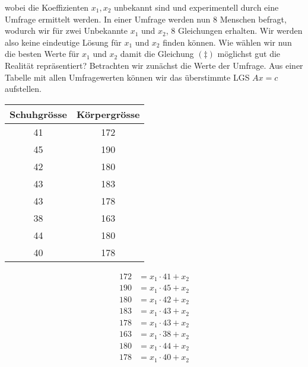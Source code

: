wobei die Koeffizienten \( x_1, x_2\) unbekannt sind und experimentell durch eine Umfrage ermittelt werden. In einer Umfrage werden nun 8 Menschen befragt, wodurch wir für zwei Unbekannte \( x_1\) und \( x_2\), 8 Gleichungen erhalten. Wir werden also keine eindeutige Lösung für \( x_1\) und \( x_2\) finden können. Wie wählen wir nun die besten Werte für \( x_1\) und \( x_2\) damit die Gleichung \( (\ddagger) \) möglichst gut die Realität repräsentiert? Betrachten wir zunächst die Werte der Umfrage. Aus einer Tabelle mit allen Umfragewerten können wir das überstimmte LGS \( Ax = c \) aufstellen. 

\vspace{1\baselineskip}

\begin{minipage}
    {0.5\textwidth}
    \centering
        \begin{tabular}{|c|c|}
            \hline
            Schuhgrösse & Körpergrösse \\
            \hline
            41 & 172 \\
            45 & 190 \\
            42 & 180 \\
            43 & 183 \\
            43 & 178 \\
            38 & 163 \\
            44 & 180 \\
            40 & 178 \\
            \hline
        \end{tabular}
\end{minipage}
\hfill
\begin{minipage}
    {0.45\textwidth}
    \centering
    \begin{equation*}
        \begin{aligned}
            172 &= x_1\cdot 41 + x_2\\
            190 &= x_1\cdot 45 + x_2\\
            180 &= x_1\cdot 42 + x_2\\
            183 &= x_1\cdot 43 + x_2\\
            178 &= x_1\cdot 43 + x_2\\
            163 &= x_1\cdot 38 + x_2\\
            180 &= x_1\cdot 44 + x_2\\
            178 &= x_1\cdot 40 + x_2\\
        \end{aligned}
    \end{equation*}
\end{minipage}

